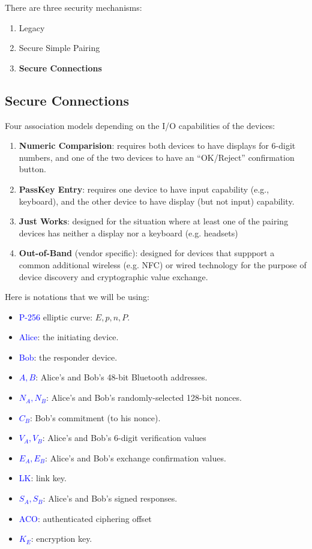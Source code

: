 \documentclass[12pt,titlepage]{article}
\begin{document}
There are three security mechanisms:\begin{enumerate}
	\item Legacy
	\item Secure Simple Pairing
	\item \textbf{Secure Connections}
\end{enumerate}
\subsection{Secure Connections}
Four association models depending on the I/O capabilities of the devices: \begin{enumerate}
	\item \textbf{Numeric Comparision}: requires both devices to have displays for 6-digit numbers, and one of the two devices to have an ``OK/Reject'' confirmation button.
	\item \textbf{PassKey Entry}: requires one device to have input capability (e.g., keyboard), and the other device to have display (but not input) capability.
	\item \textbf{Just Works}: designed for the situation where at least one of the pairing devices has neither a display nor a keyboard (e.g. headsets)
	\item \textbf{Out-of-Band} (vendor specific): designed for devices that suppport a common additional wireless (e.g. NFC) or wired technology for the purpose of device discovery and cryptographic value exchange.
\end{enumerate}
Here is notations that we will be using: \begin{itemize}
	\item \textcolor{blue}{P-256} elliptic curve: $E, p, n, P$.
	\item \textcolor{blue}{Alice}: the initiating device.
	\item \textcolor{blue}{Bob}: the responder device.
	\item \textcolor{blue}{$A,B$}: Alice’s and Bob’s 48-bit Bluetooth addresses.
	\item \textcolor{blue}{$N_A, N_B$}: Alice’s and Bob’s randomly-selected 128-bit nonces.
	\item \textcolor{blue}{$C_B$}: Bob’s commitment (to his nonce).
	\item \textcolor{blue}{$V_A, V_B$}: Alice’s and Bob’s 6-digit verification values
	\item \textcolor{blue}{$E_A, E_B$}: Alice’s and Bob’s exchange confirmation values.
	\item \textcolor{blue}{LK}: link key.
	\item \textcolor{blue}{$S_A, S_B$}: Alice’s and Bob’s signed responses.
	\item \textcolor{blue}{ACO}: authenticated ciphering offset
	\item \textcolor{blue}{$K_E$}: encryption key.
\end{itemize}
\end{document}
